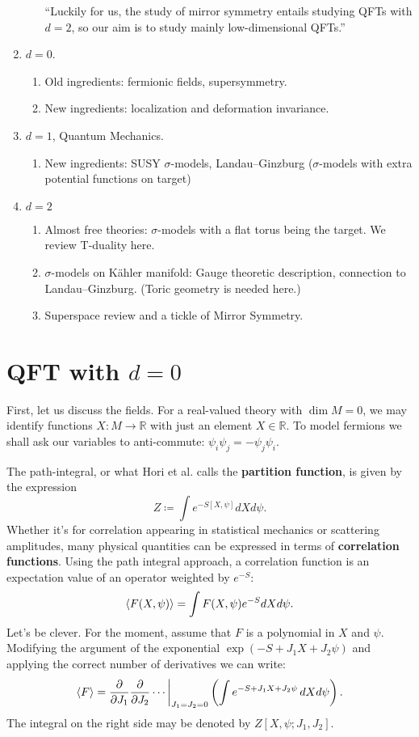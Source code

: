 \documentclass{report}
\theoremstyle{plain}
\theoremstyle{definition}
\theoremstyle{remark}
\newcommand{\di}{\partial}
\newcommand{\bR}{\mathbb{R}}
\newcommand{\sg}{\sigma}
\newcommand{\FR}[2]{\frac{#1}{#2}}
\begin{document}
\begin{enumerate}
\begin{enumerate}
                ``Luckily for us, the study of mirror symmetry entails
                studying QFTs with $d=2$, so our aim is to study mainly
                low-dimensional QFTs.''
        \end{enumerate}
    \item $d=0$.
        \begin{enumerate}
            \item Old ingredients: fermionic fields, supersymmetry.
            \item New ingredients: localization and deformation invariance.
        \end{enumerate}
    \item $d=1$, Quantum Mechanics.
        \begin{enumerate}
            \item New ingredients: SUSY $\sg$-models, Landau--Ginzburg
                ($\sg$-models with extra potential functions on target)
        \end{enumerate}
    \item $d=2$
        \begin{enumerate}
            \item Almost free theories: $\sg$-models with a flat torus
                being the target. We review T-duality here.
            \item $\sg$-models on K\"ahler manifold: Gauge theoretic
                description, connection to Landau--Ginzburg. (Toric
                geometry is needed here.)
            \item Superspace review and a tickle of Mirror Symmetry.
        \end{enumerate}
\end{enumerate}
\section{QFT with \texorpdfstring{$d=0$}{d=0}}
First, let us discuss the fields. For a real-valued theory with $\dim M=0$, 
we may identify functions $X:M\to\bR$ with just an element $X\in\bR$. To
model fermions we shall ask our variables to anti-commute:
$\psi_i\psi_j=-\psi_j\psi_i$.

The path-integral, or what Hori et al. calls the \textbf{partition
function}, is given by the expression \[Z \coloneqq \int e^{-S[X,\psi]}dX
d\psi.\] Whether it's for correlation appearing in statistical mechanics or
scattering amplitudes, many physical quantities can be expressed in terms
of \textbf{correlation functions}. Using the path integral approach, a
correlation function is an expectation value of an operator weighted by
$e^{-S}$: \[\braket{F(X,\psi)} = \int F(X,\psi) e^{-S}  dXd\psi.\] Let's be
clever. For the moment, assume that $F$ is a polynomial in $X$ and $\psi$.
Modifying the argument of the exponential $\exp(-S + J_1X+J_2\psi)$ and
applying the correct number of derivatives we can write:
\[ \braket{F} = \FR{\di}{\di J_1}\FR{\di}{\di J_2}\cdots
\biggr|_{J_1=J_2=0} \left(\int e^{-S+J_1X+J_2\psi}\, dXd\psi\right). \]
The integral on the right side may be denoted by $Z[X,\psi;J_1,J_2]$.
\end{document}
